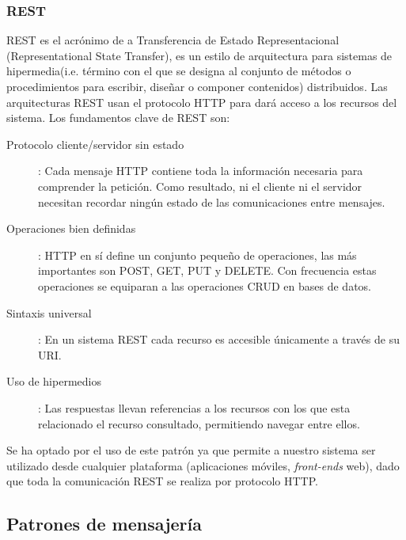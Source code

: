 \subsubsection{REST}
REST es el acrónimo de a Transferencia de Estado Representacional (Representational State Transfer), es un estilo de arquitectura para sistemas de hipermedia(i.e. término con el que se designa al conjunto de métodos o procedimientos para escribir, diseñar o componer contenidos) distribuidos.
Las arquitecturas REST usan el protocolo HTTP para dará acceso a los recursos del sistema. Los fundamentos clave de REST son:
\begin{description}
\item[Protocolo cliente/servidor sin estado]: Cada mensaje HTTP contiene toda la información necesaria para comprender la petición. Como resultado, ni el cliente ni el servidor necesitan recordar ningún estado de las comunicaciones entre mensajes. 
\item[Operaciones bien definidas]: HTTP en sí define un conjunto pequeño de operaciones, las más importantes son POST, GET, PUT y DELETE. Con frecuencia estas operaciones se equiparan a las operaciones CRUD en bases de datos.
\item[Sintaxis universal]: En un sistema REST cada recurso es accesible únicamente a través de su URI.
\item[Uso de hipermedios]: Las respuestas llevan referencias a los recursos con los que esta relacionado el recurso consultado, permitiendo navegar entre ellos. 
\end{description}
Se ha optado por el uso de este patrón ya que permite a nuestro sistema ser utilizado desde cualquier plataforma (aplicaciones móviles, \textit{front-ends} web), dado que toda la comunicación REST se realiza por protocolo HTTP.

\subsection{Patrones de mensajería}
